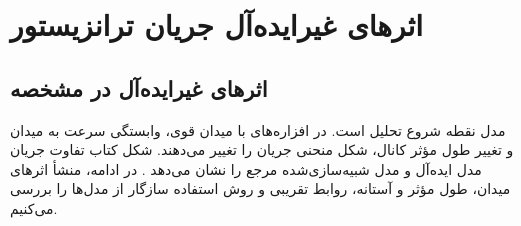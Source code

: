 \ifCompleteNotes\else
{}
\setcounter{chapter}{1}
\chapter{اثرهای غیرایده‌آل جریان ترانزیستور}
\fi
\setcounter{section}{3}
\section{اثرهای غیرایده‌آل در مشخصه }
\label{sec:nonideal-current}
مدل  نقطه شروع تحلیل است. در افزاره‌های با میدان قوی،
وابستگی سرعت به میدان و تغییر طول مؤثر کانال، شکل منحنی جریان را تغییر
می‌دهند. شکل  کتاب تفاوت جریان مدل ایده‌آل و مدل شبیه‌سازی‌شده
مرجع را نشان می‌دهد \cite[صفحه چاپی ۷۴]{weste}. در ادامه، منشأ اثرهای
میدان، طول مؤثر و آستانه، روابط تقریبی و روش استفاده سازگار از مدل‌ها را
بررسی می‌کنیم.
\ifCompleteNotes
{}
\fi

\clearpage





